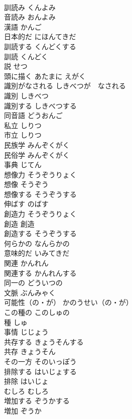 \documentclass[8pt]{extreport}
\begin{document}
\begin{CJK}{UTF8}{min}
\\	訓読み	くんよみ	
\\	音読み	おんよみ	
\\	漢語	かんご	
\\	日本的だ	にほんてきだ	
\\	訓読する	くんどくする	
\\	訓読	くんどく	
\\	説	せつ	
\\	頭に描く	あたまに えがく	
\\	識別がなされる	しきべつが　なされる	
\\	識別	しきべつ	
\\	識別する	しきべつする	
\\	同音語	どうおんご	
\\	私立	しりつ	
\\	市立	しりつ	
\\	民族学	みんぞくがく	
\\	民俗学	みんぞくがく	
\\	事典	じてん	
\\	想像力	そうぞうりょく	
\\	想像	そうぞう	
\\	想像する	そうぞうする	
\\	伸ばす	のばす	
\\	創造力	そうぞうりょく	
\\	創造	創造	
\\	創造する	そうぞうする	
\\	何らかの	なんらかの	
\\	意味的だ	いみてきだ	
\\	関連	かんれん	
\\	関連する	かんれんする	
\\	同一の	どういつの	
\\	文脈	ぶんみゃく	
\\	可能性（の・が）	かのうせい（の・が）	
\\	この種の	このしゅの	
\\	種	しゅ	
\\	事情	じじょう	
\\	共存する	きょうそんする	
\\	共存	きょうそん	
\\	その一方	そのいっぽう	
\\	排除する	はいじょする	
\\	排除	はいじょ	
\\	むしろ	むしろ	
\\	増加する	ぞうかする	
\\	増加	ぞうか	

\end{CJK}
\end{document}
